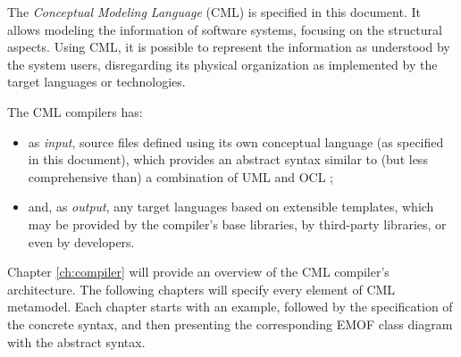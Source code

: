 The \emph{Conceptual Modeling Language} (CML) is specified in this document.
It allows modeling the information of software systems,
focusing on the structural aspects.
Using CML,
it is possible to represent the information as understood by the system users,
disregarding its physical organization as implemented by the target languages or technologies.

The CML compilers has:
\begin{itemize}
\item as \emph{input},
source files defined using its own conceptual language (as specified in this document),
which provides an abstract syntax similar to (but less comprehensive than) a combination of UML \cite{uml} and OCL \cite{ocl}; 
\item and, as \emph{output},
any target languages based on extensible templates,
which may be provided by the compiler's base libraries, by third-party libraries, or even by developers.
\end{itemize}

Chapter \ref{ch:compiler} will provide an overview of the CML compiler's architecture. The following chapters will specify every element of CML metamodel.
Each chapter starts with an example,
followed by the specification of the concrete syntax,
and then presenting the corresponding EMOF \cite{emof} class diagram with the abstract syntax.

